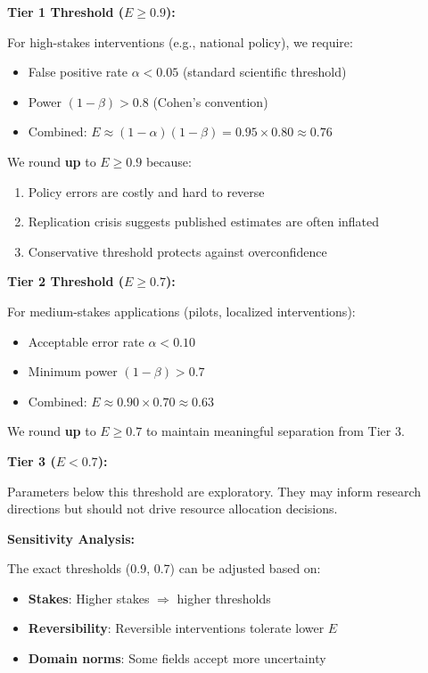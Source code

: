 \documentclass[11pt,a4paper]{article}
\theoremstyle{definition}
\begin{document}
\begin{tcolorbox}[colback=gray!5!white, colframe=gray!75!black, 
    title=\textbf{Derivation of Tier Thresholds}]

\textbf{Tier 1 Threshold ($E \geq 0.9$):}

For high-stakes interventions (e.g., national policy), we require:
\begin{itemize}[nosep]
\item False positive rate $\alpha < 0.05$ (standard scientific threshold)
\item Power $(1-\beta) > 0.8$ (Cohen's convention)
\item Combined: $E \approx (1-\alpha)(1-\beta) = 0.95 \times 0.80 \approx 0.76$
\end{itemize}

We round \textbf{up} to $E \geq 0.9$ because:
\begin{enumerate}[nosep]
\item Policy errors are costly and hard to reverse
\item Replication crisis suggests published estimates are often inflated
\item Conservative threshold protects against overconfidence
\end{enumerate}

\textbf{Tier 2 Threshold ($E \geq 0.7$):}

For medium-stakes applications (pilots, localized interventions):
\begin{itemize}[nosep]
\item Acceptable error rate $\alpha < 0.10$
\item Minimum power $(1-\beta) > 0.7$
\item Combined: $E \approx 0.90 \times 0.70 \approx 0.63$
\end{itemize}

We round \textbf{up} to $E \geq 0.7$ to maintain meaningful separation from Tier 3.

\textbf{Tier 3 ($E < 0.7$):}

Parameters below this threshold are exploratory. They may inform research 
directions but should not drive resource allocation decisions.

\end{tcolorbox}

\textbf{Sensitivity Analysis:}

The exact thresholds (0.9, 0.7) can be adjusted based on:
\begin{itemize}[nosep]
\item \textbf{Stakes}: Higher stakes $\Rightarrow$ higher thresholds
\item \textbf{Reversibility}: Reversible interventions tolerate lower $E$
\item \textbf{Domain norms}: Some fields accept more uncertainty
\end{itemize}
\end{document}

